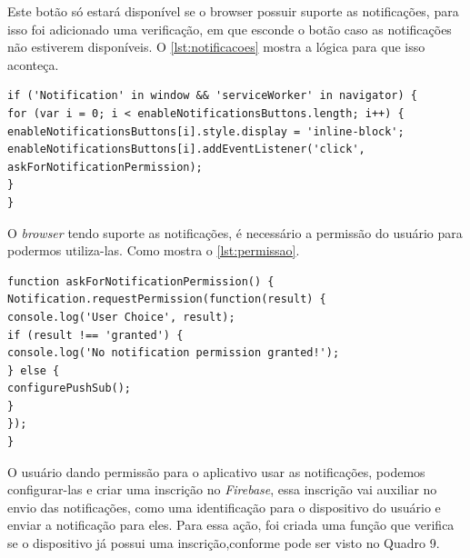 Este botão só estará disponível se o browser possuir suporte as notificações, para isso foi adicionado uma verificação, em que esconde o botão caso as notificações não estiverem disponíveis. O \autoref{lst:notificacoes} mostra a lógica para que isso aconteça.

\begin{lstlisting}[frame=single,label=lst:notificacoes,caption=Verificando suporte notificações, basicstyle=\footnotesize]
if ('Notification' in window && 'serviceWorker' in navigator) {
for (var i = 0; i < enableNotificationsButtons.length; i++) {
enableNotificationsButtons[i].style.display = 'inline-block';
enableNotificationsButtons[i].addEventListener('click', askForNotificationPermission);
}
}
\end{lstlisting}
\vspace{-0.75cm}
\begin{center}
\end{center}

\newpage
O \textit{browser} tendo suporte as notificações, é necessário a permissão do usuário para podermos utiliza-las. Como mostra o \autoref{lst:permissao}.

\begin{lstlisting}[frame=single,label=lst:permissao,caption=Pedindo permissão ao usuário, basicstyle=\footnotesize]
function askForNotificationPermission() {
Notification.requestPermission(function(result) {
console.log('User Choice', result);
if (result !== 'granted') {
console.log('No notification permission granted!');
} else {
configurePushSub();
}
});
}
\end{lstlisting}
\vspace{-0.75cm}
\begin{center}
\end{center}

O usuário dando permissão para o aplicativo usar as notificações, podemos configurar-las e criar uma inscrição no \textit{Firebase}, essa inscrição vai auxiliar no envio das notificações, como uma identificação para o dispositivo do usuário e enviar a notificação para eles. Para essa ação, foi criada uma função que verifica se o dispositivo já possui uma inscrição,conforme pode ser visto no Quadro 9.


